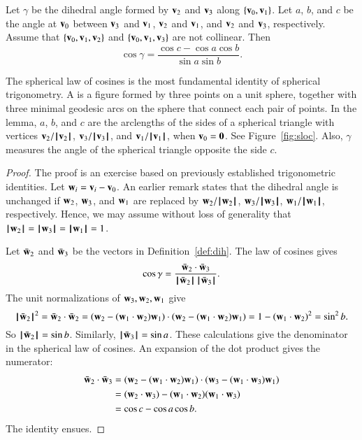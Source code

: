 \begin{lemma}\label{lemma:sloc}
    Let $\gamma$ be the
  dihedral angle formed by $\v_2$ and $\v_3$ along $\{\v_0,\v_1\}$.  Let
  $a$, $b$, and $c$ be the angle at $\v_0$ between $\v_3$ and $\v_1$, $\v_2$
  and $\v_1$, and $\v_2$ and $\v_3$, respectively. %
  Assume that $\{\v_0,\v_1,\v_2\}$ and $\{\v_0,\v_1,\v_3\}$ are not collinear.
  Then
  \[ \cos\gamma = \frac{\cos c - \cos a \cos b}{\sin
      a\sin b}.\] 
\end{lemma}
%
%
%

\begin{remark}
  The spherical law of cosines is the most fundamental identity of
  spherical trigonometry.  A  is a figure
  formed by three points on a unit sphere, together with three minimal
  geodesic arcs on the sphere that connect each pair of points.  In
  the lemma, $a$, $b$, and $c$ are the arclengths of the sides of a
  spherical triangle with vertices $\v_2/\normo{\v_2}$,
  $\v_3/\normo{\v_3}$, and $\v_1/\normo{\v_1}$, when $\v_0=\orz$. See Figure~\ref{fig:sloc}.
  Also, $\gamma$ measures the angle of the spherical triangle opposite
  the side $c$.  %
\end{remark}

\figNUPFYMD %


\begin{proof} The proof is an exercise based on previously established
  trigonometric identities.  Let $\w_i = \v_i-\v_0$.  An earlier
  remark states that the dihedral angle is
  unchanged if $\w_2$, $\w_3$, and $\w_1$ are replaced by
  $\w_2/\normo{\w_2}$, $\w_3/\normo{\w_3}$, $\w_1/\normo{\w_1}$,
  respectively.  Hence, we may assume without loss of generality that
  $\normo{\w_2}=\normo{\w_3}=\normo{\w_1}=1$.

Let $\bar \w_2$ and $\bar \w_3$ be the vectors in Definition~\ref{def:dih}.
The law of cosines gives
\[ \cos\gamma = \frac{\bar \w_2\cdot \bar \w_3}
{\normo{\bar \w_2}\,\normo{\bar \w_3}}.
\] 
The unit normalizations of $\w_3,\w_2,\w_1$ give
\[ 
\normo{\bar \w_2}^2 = \bar \w_2\cdot \bar \w_2 =
(\w_2 - (\w_1\cdot \w_2)\w_1)\cdot (\w_2 - (\w_1\cdot \w_2) \w_1) =
1 - (\w_1\cdot \w_2)^2 = \sin^2 b.
\] 
So $\normo{\bar \w_2} =\sin b$. Similarly, $\normo{\bar \w_3} = \sin a$.
These calculations give the denominator in the spherical law of cosines.  An
expansion of the dot product gives the numerator:
\begin{align*}
\bar \w_2\cdot \bar \w_3 &=
 (\w_2 - (\w_1\cdot \w_2) \w_1)\cdot (\w_3 - (\w_1\cdot \w_3) \w_1)\\
&= (\w_2\cdot \w_3) - (\w_1\cdot \w_2) (\w_1\cdot \w_3) \\
&= \cos c - \cos a \cos b.
\end{align*}
The identity ensues.
\end{proof}

